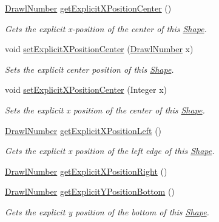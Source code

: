 \begin{DoxyCompactItemize}
\hyperlink{classcom_1_1aarrelaakso_1_1drawl_1_1_drawl_number}{Drawl\+Number} \hyperlink{classcom_1_1aarrelaakso_1_1drawl_1_1_shape_aaecae2f51794b77ff2f76b1be64b0d90}{get\+Explicit\+X\+Position\+Center} ()
\begin{DoxyCompactList}\small\item\em Gets the explicit x-\/position of the center of this \hyperlink{classcom_1_1aarrelaakso_1_1drawl_1_1_shape}{Shape}. \end{DoxyCompactList}\item 
void \hyperlink{classcom_1_1aarrelaakso_1_1drawl_1_1_shape_a43d67e2711163383c32d8c14a6b17e2c}{set\+Explicit\+X\+Position\+Center} (\hyperlink{classcom_1_1aarrelaakso_1_1drawl_1_1_drawl_number}{Drawl\+Number} x)
\begin{DoxyCompactList}\small\item\em Sets the explicit center position of this \hyperlink{classcom_1_1aarrelaakso_1_1drawl_1_1_shape}{Shape}. \end{DoxyCompactList}\item 
void \hyperlink{classcom_1_1aarrelaakso_1_1drawl_1_1_shape_aa7855df6d98b3bfa556b7d857755181b}{set\+Explicit\+X\+Position\+Center} (Integer x)
\begin{DoxyCompactList}\small\item\em Sets the explicit x position of the center of this \hyperlink{classcom_1_1aarrelaakso_1_1drawl_1_1_shape}{Shape}. \end{DoxyCompactList}\item 
\hyperlink{classcom_1_1aarrelaakso_1_1drawl_1_1_drawl_number}{Drawl\+Number} \hyperlink{classcom_1_1aarrelaakso_1_1drawl_1_1_shape_a339cf8811f57b7cb5251109b04be953c}{get\+Explicit\+X\+Position\+Left} ()
\begin{DoxyCompactList}\small\item\em Gets the explicit x position of the left edge of this \hyperlink{classcom_1_1aarrelaakso_1_1drawl_1_1_shape}{Shape}. \end{DoxyCompactList}\item 
\hyperlink{classcom_1_1aarrelaakso_1_1drawl_1_1_drawl_number}{Drawl\+Number} \hyperlink{classcom_1_1aarrelaakso_1_1drawl_1_1_shape_a19970b658b55e4e61de31aaaef8cf7fe}{get\+Explicit\+X\+Position\+Right} ()
\item 
\hyperlink{classcom_1_1aarrelaakso_1_1drawl_1_1_drawl_number}{Drawl\+Number} \hyperlink{classcom_1_1aarrelaakso_1_1drawl_1_1_shape_aa26eb0263851ed8f8221bf3740e6e584}{get\+Explicit\+Y\+Position\+Bottom} ()
\begin{DoxyCompactList}\small\item\em Gets the explicit y position of the bottom of this \hyperlink{classcom_1_1aarrelaakso_1_1drawl_1_1_shape}{Shape}. \end{DoxyCompactList}\item 

\end{DoxyCompactItemize}
